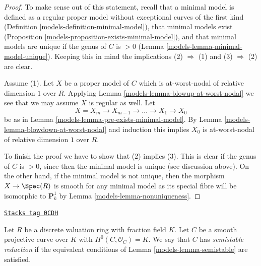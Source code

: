 \begin{proof}

To make sense out of this statement, recall that a
minimal model is defined as a regular proper model
without exceptional curves of the first kind
(Definition \ref{models-definition-minimal-model}),
that minimal models exist
(Proposition \ref{models-proposition-exists-minimal-model}), and
that minimal models are unique if the genus
of $C$ is $> 0$ (Lemma \ref{models-lemma-minimal-model-unique}).
Keeping this in mind the implications (2) $\Rightarrow$ (1)
and (3) $\Rightarrow$ (2) are clear.

\medskip\noindent
Assume (1). Let $X$ be a proper model of $C$ which is
at-worst-nodal of relative dimension $1$ over $R$.
Applying Lemma \ref{models-lemma-blowup-at-worst-nodal}
we see that we may assume $X$ is regular as well.
Let
$$
X = X_m \to X_{m - 1} \to \ldots \to X_1 \to X_0
$$
be as in Lemma \ref{models-lemma-pre-exists-minimal-model}.
By Lemma \ref{models-lemma-blowdown-at-worst-nodal} and induction
this implies $X_0$ is at-worst-nodal of relative dimension $1$ over $R$.

\medskip\noindent
To finish the proof we have to show that (2) implies (3).
This is clear if the genus of $C$ is $> 0$, since then
the minimal model is unique (see discussion above).
On the other hand, if the minimal model is not unique, then
the morphism $X \to \Spec(R)$ is smooth for any minimal model
as its special fibre will be isomorphic to $\mathbf{P}^1_k$
by Lemma \ref{models-lemma-nonuniqueness}.
\end{proof}

\begin{definition}[Semistable]
\label{models-definition-semistable}
\href{https://stacks.math.columbia.edu/tag/0CDH}{\texttt{Stacks tag 0CDH}}

Let $R$ be a discrete valuation ring with fraction field $K$.
Let $C$ be a smooth projective curve over $K$ with $H^0(C, \mathcal{O}_C) = K$.
We say that $C$ has {\it semistable reduction} if the equivalent
conditions of Lemma \ref{models-lemma-semistable} are satisfied.
\end{definition}

